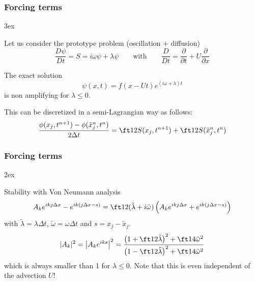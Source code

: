 \documentclass[aspectratio=149,9pt]{beamer}
\begin{document}
\begin{frame}
	\frametitle{Forcing terms}
	\begin{myitemize}{3ex}
		\item Let us consider the prototype problem (oscillation $+$ diffusion)
			\begin{equation*}
				\frac{D \psi}{D t} = S = i \omega \psi + \lambda \psi \qquad \text{with} \qquad \frac{D}{Dt} = \frac{\partial}{\partial t} + U \frac{\partial}{\partial x}
			\end{equation*}
		\item The exact solution
			\begin{equation*}
				\psi(x,t) = f (x - U t) e^{(i \omega + \lambda) t}
			\end{equation*}
			is non amplifying for $\lambda \le 0$.
		\item This can be discretized in a semi-Lagrangian way as follows:
			\begin{equation*}
				\frac{\phi (x_j, t^{n+1}) - \phi (\tilde x_j^{n}, t^{n})}{2 \Delta t} =  \ft12 S(x_j, t^{n+1} )+\ft12 S(\tilde x_j^n,t^n)
			\end{equation*}
	\end{myitemize}
\end{frame}
%
%
\begin{frame}
	\frametitle{Forcing terms}
	\begin{myitemize}{2ex}
		\item Stability with Von Neumann analysis
			\begin{equation*}
				A_k e^{i k j \Delta x} - e^{ik (j \Delta x - s)} = \ft12 (\tilde \lambda + i \tilde \omega ) \left( A_k e^{ikj \Delta x} + e^{ik (j \Delta x -s)}\right)
			\end{equation*}
			with $\tilde \lambda = \lambda \Delta t$, $\tilde \omega = \omega \Delta t$ and $s=x_j-\tilde x_j$.
			\begin{equation*}
				| A_k |^2 = \left| A_k e^{iks} \right|^2 = \frac{ \left( 1 + \ft12 \tilde \lambda  \right)^2 + \ft14 \tilde \omega^2 }{ \left( 1 - \ft12 \tilde \lambda \right)^2 + \ft14 \tilde \omega^2 }
			\end{equation*}
			which is always smaller than 1 for $\lambda \le 0$. Note that this is even independent of the advection $U$!
	\end{myitemize}
\end{frame}
%
\end{document}
